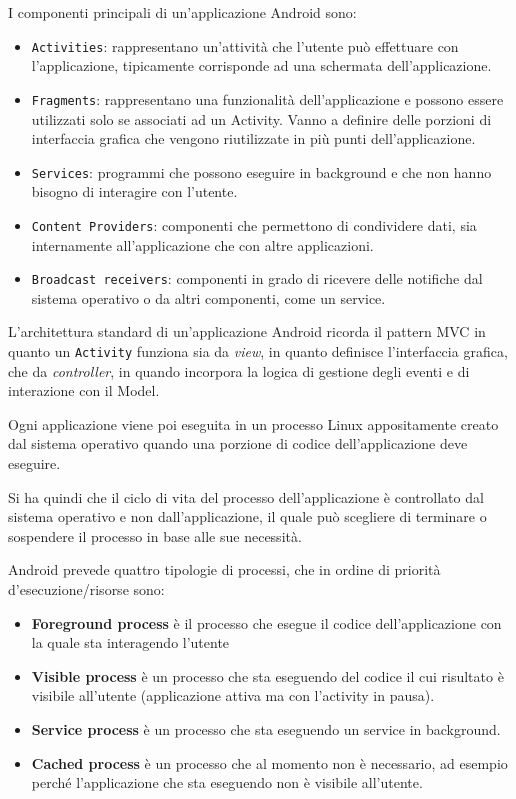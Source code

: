 I componenti principali di un'applicazione Android sono:

\begin{itemize}
	\item \texttt{Activities}: rappresentano un'attività che l'utente può
		effettuare con l'applicazione, tipicamente corrisponde ad una
		schermata dell'applicazione.
	\item \texttt{Fragments}: rappresentano una funzionalità dell'applicazione e
		possono essere utilizzati solo se associati ad un Activity. Vanno a
		definire delle porzioni di interfaccia grafica che vengono
		riutilizzate in più punti dell'applicazione.
	\item \texttt{Services}: programmi che possono eseguire in background e che
		non hanno bisogno di interagire con l'utente.
	\item \texttt{Content Providers}: componenti che permettono di condividere
		dati, sia internamente all'applicazione che con altre applicazioni.
	\item \texttt{Broadcast receivers}: componenti in grado di ricevere delle
		notifiche dal sistema operativo o da altri componenti, come un
		service.
\end{itemize}

L'architettura standard di un'applicazione Android ricorda il pattern
MVC in quanto un \texttt{Activity} funziona sia da \textit{view}, in quanto definisce
l'interfaccia grafica, che da \textit{controller}, in quando incorpora la logica
di gestione degli eventi e di interazione con il Model.

Ogni applicazione viene poi eseguita in un processo Linux appositamente
creato dal sistema operativo quando una porzione di codice
dell'applicazione deve eseguire.

Si ha quindi che il ciclo di vita del processo dell'applicazione è
controllato dal sistema operativo e non dall'applicazione, il quale può
scegliere di terminare o sospendere il processo in base alle sue
necessità.

Android prevede quattro tipologie di processi, che in ordine di priorità
d'esecuzione/risorse sono:

\begin{itemize}
	\item \textbf{Foreground process} è il processo che esegue il codice
		dell'applicazione con la quale sta interagendo l'utente
	\item \textbf{Visible process} è un processo che sta eseguendo del codice il
		cui risultato è visibile all'utente (applicazione attiva ma con
		l'activity in pausa).
	\item \textbf{Service process} è un processo che sta eseguendo un service in
		background.
	\item \textbf{Cached process} è un processo che al momento non è necessario,
		ad esempio perché l'applicazione che sta eseguendo non è visibile
		all'utente.
\end{itemize}

